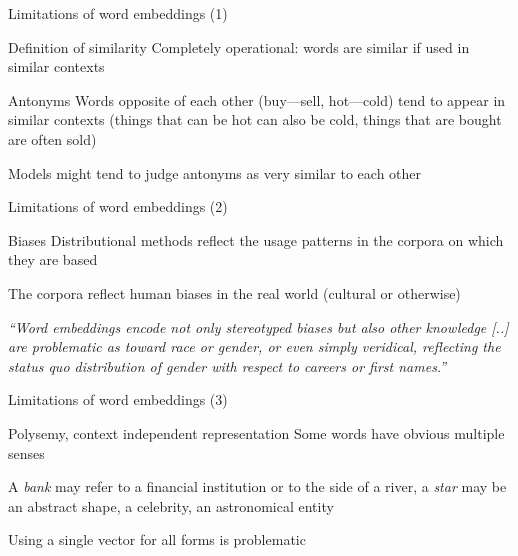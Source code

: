 \documentclass[12pt,aspectratio=169,handout]{beamer}
\begin{document}
\begin{frame}{Limitations of word embeddings (1)}

\begin{block}{Definition of similarity}
Completely operational: words are similar if used in similar contexts
\end{block}

\begin{block}{Antonyms}
Words opposite of each other (buy---sell, hot---cold) tend to appear in similar contexts (things that can be hot can also be cold, things that are bought are often sold)

Models might tend to judge antonyms as very similar to each other
\end{block}

\end{frame}

\begin{frame}{Limitations of word embeddings (2)}

\begin{block}{Biases}
Distributional methods reflect the usage patterns in the corpora on which they are based

The corpora reflect human biases in the real world (cultural or otherwise)
	
\emph{``Word embeddings encode not only stereotyped biases but also other knowledge
[..] are problematic as toward race or gender, or even simply veridical, reflecting the status quo distribution of gender with respect to careers or first names.''}
\end{block}



	
\end{frame}

\begin{frame}{Limitations of word embeddings (3)}
	
\begin{block}{Polysemy, context independent representation}
Some words have obvious multiple senses

A \emph{bank} may refer to a financial institution or to the side of a river, a \emph{star} may be an abstract shape, a celebrity, an astronomical entity

Using a single vector for all forms	is problematic
\end{block}


\end{frame}
\end{document}
